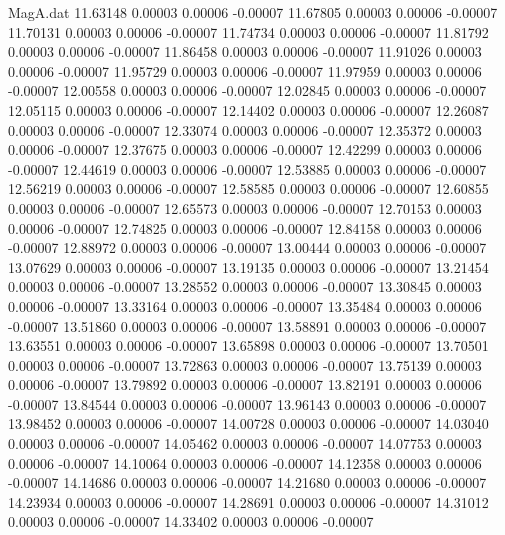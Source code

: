 \begin{filecontents}{MagA.dat}
  11.63148    0.00003    0.00006   -0.00007
  11.67805    0.00003    0.00006   -0.00007
  11.70131    0.00003    0.00006   -0.00007
  11.74734    0.00003    0.00006   -0.00007
  11.81792    0.00003    0.00006   -0.00007
  11.86458    0.00003    0.00006   -0.00007
  11.91026    0.00003    0.00006   -0.00007
  11.95729    0.00003    0.00006   -0.00007
  11.97959    0.00003    0.00006   -0.00007
  12.00558    0.00003    0.00006   -0.00007
  12.02845    0.00003    0.00006   -0.00007
  12.05115    0.00003    0.00006   -0.00007
  12.14402    0.00003    0.00006   -0.00007
  12.26087    0.00003    0.00006   -0.00007
  12.33074    0.00003    0.00006   -0.00007
  12.35372    0.00003    0.00006   -0.00007
  12.37675    0.00003    0.00006   -0.00007
  12.42299    0.00003    0.00006   -0.00007
  12.44619    0.00003    0.00006   -0.00007
  12.53885    0.00003    0.00006   -0.00007
  12.56219    0.00003    0.00006   -0.00007
  12.58585    0.00003    0.00006   -0.00007
  12.60855    0.00003    0.00006   -0.00007
  12.65573    0.00003    0.00006   -0.00007
  12.70153    0.00003    0.00006   -0.00007
  12.74825    0.00003    0.00006   -0.00007
  12.84158    0.00003    0.00006   -0.00007
  12.88972    0.00003    0.00006   -0.00007
  13.00444    0.00003    0.00006   -0.00007
  13.07629    0.00003    0.00006   -0.00007
  13.19135    0.00003    0.00006   -0.00007
  13.21454    0.00003    0.00006   -0.00007
  13.28552    0.00003    0.00006   -0.00007
  13.30845    0.00003    0.00006   -0.00007
  13.33164    0.00003    0.00006   -0.00007
  13.35484    0.00003    0.00006   -0.00007
  13.51860    0.00003    0.00006   -0.00007
  13.58891    0.00003    0.00006   -0.00007
  13.63551    0.00003    0.00006   -0.00007
  13.65898    0.00003    0.00006   -0.00007
  13.70501    0.00003    0.00006   -0.00007
  13.72863    0.00003    0.00006   -0.00007
  13.75139    0.00003    0.00006   -0.00007
  13.79892    0.00003    0.00006   -0.00007
  13.82191    0.00003    0.00006   -0.00007
  13.84544    0.00003    0.00006   -0.00007
  13.96143    0.00003    0.00006   -0.00007
  13.98452    0.00003    0.00006   -0.00007
  14.00728    0.00003    0.00006   -0.00007
  14.03040    0.00003    0.00006   -0.00007
  14.05462    0.00003    0.00006   -0.00007
  14.07753    0.00003    0.00006   -0.00007
  14.10064    0.00003    0.00006   -0.00007
  14.12358    0.00003    0.00006   -0.00007
  14.14686    0.00003    0.00006   -0.00007
  14.21680    0.00003    0.00006   -0.00007
  14.23934    0.00003    0.00006   -0.00007
  14.28691    0.00003    0.00006   -0.00007
  14.31012    0.00003    0.00006   -0.00007
  14.33402    0.00003    0.00006   -0.00007

\end{filecontents}
